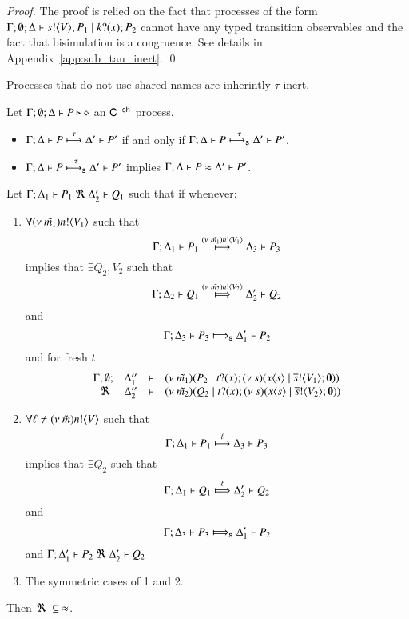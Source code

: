 \begin{proof}
	The proof is relied on the fact that processes of the
	form $\Gamma; \emptyset; \Delta \vdash s ! \langle V \rangle ; P_1 \;|\; k ? (x) ; P_2$
	cannot have any typed transition observables and the fact
	that bisimulation is a congruence.
	See details in Appendix~\ref{app:sub_tau_inert}.
	\qed
\end{proof}

Processes that do not use shared names are inherintly $\tau$-inert.

\begin{corollary}\rm
	\label{cor:tau_inert}
	Let $\Gamma; \emptyset; \Delta \vdash P \triangleright \diamond$ an $\mathsf{C}^{\mathsf{-sh}}$ process.
%
	\begin{itemize}
		\item	$\Gamma; \Delta \vdash P \stackrel{\tau}{\longmapsto} \Delta' \vdash P'$ if and only if $\Gamma; \Delta \vdash P \stackrel{\tau}{\longmapsto_{\mathsf{s}}} \Delta' \vdash P'$.
		\item	$\Gamma; \Delta \vdash P \stackrel{\tau}{\longmapsto_{\mathsf{s}}} \Delta' \vdash P'$ implies $\Gamma; \Delta \vdash P \approx \Delta' \vdash P'$.
	\end{itemize}
\end{corollary}

\begin{lemma}\rm
	\label{lem:up_to_session_transition}
	Let $\horel{\Gamma}{\Delta_1}{P_1}{\ \Re\ }{\Delta_2'}{Q_1}$ such
	that if whenever:
%
	\begin{enumerate}
		\item	$\forall (\nu\ \tilde{m_1}) n ! \langle V_1 \rangle$ such that
			\[
				\Gamma; \Delta_1 \vdash P_1 \stackrel{(\nu\ \tilde{m_1}) n ! \langle V_1 \rangle}{\longmapsto} \Delta_3 \vdash P_3
			\]
			implies that $\exists Q_2, V_2$ such that
			\[
				\horel{\Gamma}{\Delta_2}{Q_1}{\Hby{\news{\tilde{m_2}} \bactout{n}{V_2}}}{\Delta_2'}{Q_2}
			\]
			and
			\[
				\horel{\Gamma}{\Delta_3}{P_3}{\SHby{}}{\Delta_1'}{P_2}
			\]
			and for fresh $t$:
			\[
				\begin{array}{rcll} \Gamma; \emptyset; &\Delta_1''& \vdash& (\nu\ \tilde{m_1})(P_2 \;|\; t ? (x) ; (\nu\ s)(x\langle s \rangle \;|\; \overline{s} ! \langle V_1 \rangle ; \mathbf{0}))\\ \ \Re\  &\Delta_2''& \vdash &  (\nu\ \tilde{m_2})(Q_2 \;|\; t ? (x) ; (\nu\ s)(x\langle s \rangle \;|\; \overline{s} ! \langle V_2 \rangle ; \mathbf{0})) \end{array}
			\]
%
		\item	$\forall \ell \not= (\nu\ \tilde{m}) n ! \langle V \rangle$ such that
			\[
				\Gamma; \Delta_1 \vdash P_1 \stackrel{\ell}{\longmapsto} \Delta_3 \vdash P_3
			\]
			implies that $\exists Q_2$ such that 
			\[
				\horel{\Gamma}{\Delta_1}{Q_1}{\Hby{\ell}}{\Delta_2'}{Q_2}
			\]
			and
			\[
				\horel{\Gamma}{\Delta_3}{P_3}{\SHby{}}{\Delta_1'}{P_2}
			\]
			and
			$\horel{\Gamma}{\Delta_1'}{P_2}{\ \Re\ }{\Delta_2'}{Q_2}$

		\item	The symmetric cases of 1 and 2.
	\end{enumerate}
	Then $\Re\ \subseteq\ \approx$.
\end{lemma}


